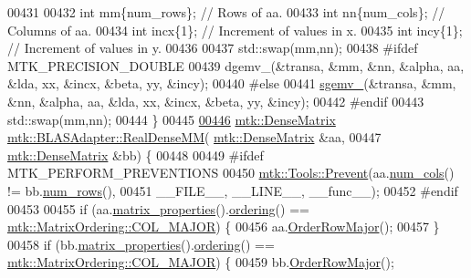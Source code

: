 \begin{DoxyCode}
00431 
00432   \textcolor{keywordtype}{int} mm\{num\_rows\}; \textcolor{comment}{// Rows of aa.}
00433   \textcolor{keywordtype}{int} nn\{num\_cols\}; \textcolor{comment}{// Columns of aa.}
00434   \textcolor{keywordtype}{int} incx\{1\};      \textcolor{comment}{// Increment of values in x.}
00435   \textcolor{keywordtype}{int} incy\{1\};      \textcolor{comment}{// Increment of values in y.}
00436 
00437   std::swap(mm,nn);
00438 \textcolor{preprocessor}{  #ifdef MTK\_PRECISION\_DOUBLE}
00439   dgemv\_(&transa, &mm, &nn, &alpha, aa, &lda, xx, &incx, &beta, yy, &incy);
00440 \textcolor{preprocessor}{  #else}
00441   \hyperlink{namespacemtk_a88daff7ad6f251a58b94aa2d0c94d069}{sgemv\_}(&transa, &mm, &nn, &alpha, aa, &lda, xx, &incx, &beta, yy, &incy);
00442 \textcolor{preprocessor}{  #endif}
00443   std::swap(mm,nn);
00444 \}
00445 
\hypertarget{mtk__blas__adapter_8cc_source_l00446}{}\hyperlink{classmtk_1_1BLASAdapter_acebd0e9bfe0bdd609c7fbea98ccfd3b5}{00446} \hyperlink{classmtk_1_1DenseMatrix}{mtk::DenseMatrix} \hyperlink{classmtk_1_1BLASAdapter_acebd0e9bfe0bdd609c7fbea98ccfd3b5}{mtk::BLASAdapter::RealDenseMM}(
      \hyperlink{classmtk_1_1DenseMatrix}{mtk::DenseMatrix} &aa,
00447                                                \hyperlink{classmtk_1_1DenseMatrix}{mtk::DenseMatrix} &bb) \{
00448 
00449 \textcolor{preprocessor}{  #ifdef MTK\_PERFORM\_PREVENTIONS}
00450   \hyperlink{classmtk_1_1Tools_a332324c6f25e66be9dff48c5987a3b9f}{mtk::Tools::Prevent}(aa.\hyperlink{classmtk_1_1DenseMatrix_a41747502d468c6728a4be31501b16e0e}{num\_cols}() != bb.\hyperlink{classmtk_1_1DenseMatrix_a53f3afb3b6a8d21854458aaa9663cc74}{num\_rows}(),
00451                       \_\_FILE\_\_, \_\_LINE\_\_, \_\_func\_\_);
00452 \textcolor{preprocessor}{  #endif}
00453 
00455   \textcolor{keywordflow}{if} (aa.\hyperlink{classmtk_1_1DenseMatrix_a5aa83a0643f27a4652ea97630edf7143}{matrix\_properties}().\hyperlink{classmtk_1_1Matrix_a13cd17621652cd5551ff98549bd94df7}{ordering}() == 
      \hyperlink{namespacemtk_ga622801bd9f912d0f976c3e383f5f581ca34d2765ffc490951febdcca04bc4f7cd}{mtk::MatrixOrdering::COL\_MAJOR}) \{
00456     aa.\hyperlink{classmtk_1_1DenseMatrix_ac2949efba3e8278335d45418c85433e4}{OrderRowMajor}();
00457   \}
00458   \textcolor{keywordflow}{if} (bb.\hyperlink{classmtk_1_1DenseMatrix_a5aa83a0643f27a4652ea97630edf7143}{matrix\_properties}().\hyperlink{classmtk_1_1Matrix_a13cd17621652cd5551ff98549bd94df7}{ordering}() == 
      \hyperlink{namespacemtk_ga622801bd9f912d0f976c3e383f5f581ca34d2765ffc490951febdcca04bc4f7cd}{mtk::MatrixOrdering::COL\_MAJOR}) \{
00459     bb.\hyperlink{classmtk_1_1DenseMatrix_ac2949efba3e8278335d45418c85433e4}{OrderRowMajor}();

\end{DoxyCode}
